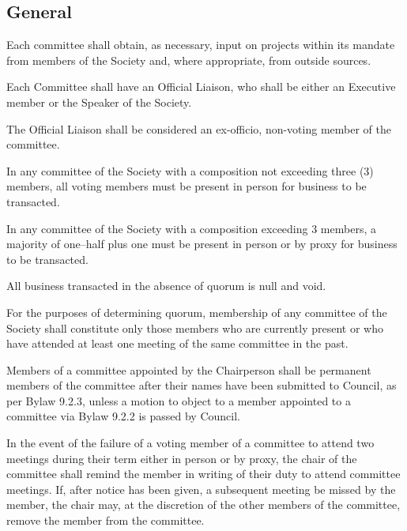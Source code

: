\subsection {General}
\begin{longenum}[ label*=\thesubsection.\arabic*., align=left]
	\item Each committee shall obtain, as necessary, input on projects within its mandate from members of the Society and, where appropriate, from outside sources. 
    \item Each Committee shall have an Official Liaison, who shall be either an Executive member or the Speaker of the Society. 
    \item The Official Liaison shall be considered an ex-officio, non-voting member of the committee.
    \item In any committee of the Society with a composition not exceeding three (3) members, all voting members must be present in person for business to be transacted.
    \item In any committee of the Society with a composition exceeding 3 members, a majority of one--half plus one must be present in person or by proxy for business to be transacted. 
    \item All business transacted in the absence of quorum is null and void. 
    \item For the purposes of determining quorum, membership of any committee of the Society shall constitute only those members who are currently present or who have attended at least one meeting of the same committee in the past.
    \item Members of a committee appointed by the Chairperson shall be permanent members of the committee after their names have been submitted to Council, as per Bylaw 9.2.3, unless a motion to object to a member appointed to a committee via Bylaw 9.2.2 is passed by Council.
    \item In the event of the failure of a voting member of a committee to attend two meetings during their term either in person or by proxy, the chair of the committee shall remind the member in writing of their duty to attend committee meetings. If, after notice has been given, a subsequent meeting be missed by the member, the chair may, at the discretion of the other members of the committee, remove the member from the committee.
\end{longenum}

